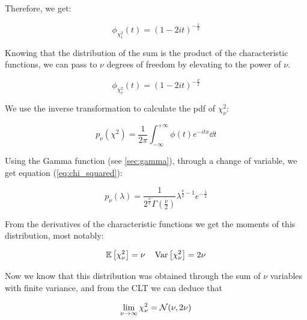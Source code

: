 Therefore, we get:
	
	\[
	\phi_{\chi_1^2}(t) = \left(1-2it\right)^{-\frac{1}{2}}
	\]
	
Knowing that the distribution of the sum  is the product of the characteristic functions, we can pass to $\nu$ degrees of freedom by elevating to the power of $\nu$.
	
	\[
	\phi_{\chi_\nu^2}(t) = \left(1-2it\right)^{-\frac{\nu}{2}}
	\]
	
We use the inverse transformation to calculate the pdf of $\chi_\nu^2$:
	
	\[
	p_\nu(\chi^2) = \frac{1}{2\pi}\int_{-\infty}^{+\infty}\phi(t)e^{-itx}\dd t
	\]
	
Using the Gamma function (see \ref{sec:gamma}), through a change of variable, we get equation (\ref{eq:chi_squared}):
	
	\[
	p_\nu(\lambda) = \frac{1}{2^{\frac{\nu}{2}} \Gamma(\frac{\nu}{2})}\lambda^{\frac{\nu}{2}-1}e^{-\frac{\lambda}{2}}
	\]
	
From the derivatives of the characteristic functions we get the moments of this distribution, most notably:
	
	\[
	\mathbb{E}\left[\chi_\nu^2\right] =\nu\quad \operatorname{Var}\left[\chi_\nu^2\right] = 2\nu
	\]
	
Now we know that this distribution was obtained through the sum of $\nu$ variables with finite variance, and from the CLT we can deduce that
	
	\[
	\lim_{\nu \to \infty} \chi_\nu^2 = \mathcal{N}(\nu,2\nu)
	\]


